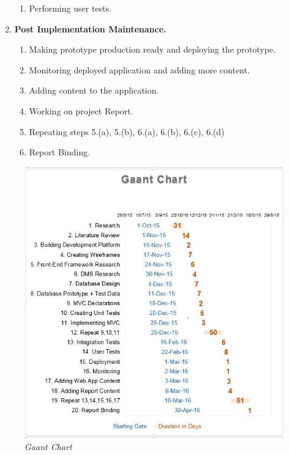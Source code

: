 \documentclass[12pt,twoside,a4paper]{report}
\begin{document}
\begin{enumerate}
\begin{enumerate}
	\item Performing user tests.
	\end{enumerate}
\item \textbf{Post Implementation Maintenance.}
	\begin{enumerate}\itemsep1pt \parskip0pt 
	\item Making prototype production ready and deploying the prototype.
	\item Monitoring deployed application and adding more content.
	\item Adding content to the application.
	\item Working on project Report.
	\item Repeating steps 5.(a), 5.(b), 6.(a), 6.(b), 6.(c), 6.(d)
	\item Report Binding.
	\end{enumerate}
\end{enumerate}
\begin{figure}[!ht]
	\centering
		\includegraphics[width=1\textwidth,totalheight=10cm]{gaant}
	\caption{\textit{Gaant Chart}}
	\label{f1.2}
\end{figure}
\end{document}
